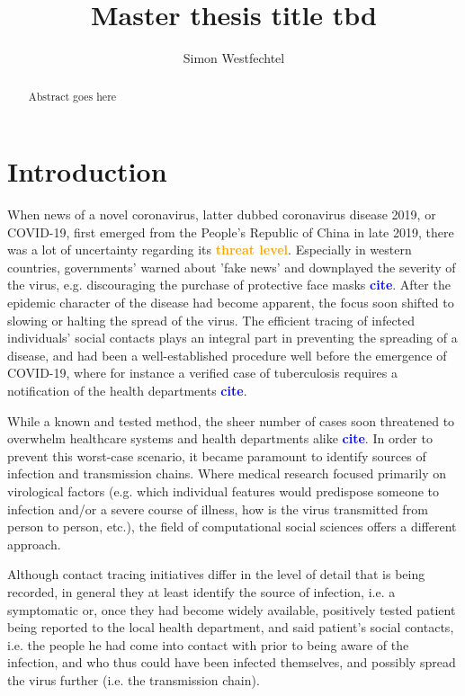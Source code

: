 \documentclass{article}
\title{Master thesis title tbd}
\author{Simon Westfechtel}
\newcommand{\re}[1]{\textbf{\textcolor{orange}{#1}}}
\newcommand{\add}[1]{\textbf{\textcolor{blue}{#1}}}
\begin{document}
	\maketitle
	\begin{abstract}
		Abstract goes here
	\end{abstract}

	\section{Introduction}
	When news of a novel coronavirus, latter dubbed coronavirus disease 2019, or COVID-19, first emerged from the People's Republic of China in late 2019, there was a lot of uncertainty regarding its \re{threat level}. Especially in western countries, governments' warned about 'fake news' and downplayed the severity of the virus, e.g. discouraging the purchase of protective face masks \add{cite}. After the epidemic character of the disease had become apparent, the focus soon shifted to slowing or halting the spread of the virus. The efficient tracing of infected individuals' social contacts plays an integral part in preventing the spreading of a disease, and had been a well-established procedure well before the emergence of COVID-19, where for instance a verified case of tuberculosis requires a notification of the health departments \add{cite}. 
	
	While a known and tested method, the sheer number of cases soon threatened to overwhelm healthcare systems and health departments alike \add{cite}. In order to prevent this worst-case scenario, it became paramount to identify sources of infection and transmission chains. Where medical research focused primarily on virological factors (e.g. which individual features would predispose someone to infection and/or a severe course of illness, how is the virus transmitted from person to person, etc.), the field of computational social sciences offers a different approach. 
	
	Although contact tracing initiatives differ in the level of detail that is being recorded, in general they at least identify the source of infection, i.e. a symptomatic or, once they had become widely available, positively tested patient being reported to the local health department, and said patient's social contacts, i.e. the people he had come into contact with prior to being aware of the infection, and who thus could have been infected themselves, and possibly spread the virus further (i.e. the transmission chain). 
	
\end{document}
